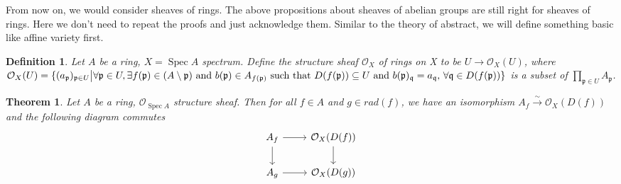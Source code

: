 \documentclass{ctexart}
\newtheorem{definition}{Definition}[section]
\newtheorem{theorem}{Theorem}[section]
\newcommand{\spec}{\operatorname{Spec}}
\begin{document}
From now on, we would consider sheaves of rings.
The above propositions about sheaves of abelian groups are still right for sheaves of rings.
Here we don't need to repeat the proofs and just acknowledge them.
Similar to the theory of abstract, we will define something basic like affine variety first.
\begin{definition}
    Let $A$ be a ring, $X = \spec A$ spectrum.
    Define the structure sheaf $\mathcal{O}_{X}$ of rings on X to be $U \longrightarrow \mathcal{O}_{X}(U)$, 
    where $\mathcal{O}_{X}(U) = \{(a_{\mathfrak{p}})_{\mathfrak{p}\in U} \big{|} \forall \mathfrak{p}\in U, \exists f(\mathfrak{p})\in (A \setminus \mathfrak{p}) \text{ and } b(\mathfrak{p})\in A_{f(\mathfrak{p})} \text{ such that $D(f(\mathfrak{p})) \subseteq U$ and $b(\mathfrak{p})_{\mathfrak{q}} = a_{\mathfrak{q}}$, $\forall \mathfrak{q}\in D(f(\mathfrak{p}))$}\}$ is a subset of $\prod_{\mathfrak{p}\in U} A_{\mathfrak{p}}$.
\end{definition}
\begin{theorem}
    Let $A$ be a ring, $\mathcal{O}_{\spec A}$ structure sheaf.
    Then for all $f\in A$ and $g\in rad(f)$, we have an isomorphism $A_{f} \overset{\sim}{\longrightarrow} \mathcal{O}_{X}(D(f))$ and the following diagram commutes
    \begin{equation*}
        \begin{tikzcd}
            A_{f} \arrow[r] \arrow[d] &
            \mathcal{O}_{X}(D(f)) \arrow[d] \\
            A_{g} \arrow[r] &
            \mathcal{O}_{X}(D(g))
        \end{tikzcd}
    \end{equation*}
    \label{Theorem 1.1}
\end{theorem}
\end{document}
